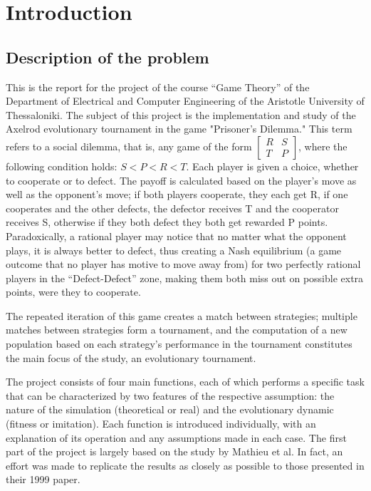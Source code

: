 \section{Introduction}
\subsection{Description of the problem}
This is the report for the project of the course ``Game Theory'' of the Department of Electrical and Computer Engineering of the Aristotle University of Thessaloniki. The subject of this project is the implementation and study of the Axelrod evolutionary tournament in the game "Prisoner's Dilemma." This term refers to a social dilemma, that is, any game of the form $\begin{bmatrix} R & S \\ T & P \end{bmatrix}$, where the following condition holds: $S < P < R < T$. Each player is given a choice, whether to cooperate or to defect. The payoff is calculated based on the player's move as well as the opponent's move; if both players cooperate, they each get R, if one cooperates and the other defects, the defector receives T and the cooperator receives S, otherwise if they both defect they both get rewarded P points. Paradoxically, a rational player may notice that no matter what the opponent plays, it is always better to defect, thus creating a Nash equilibrium (a game outcome that no player has motive to move away from) for two perfectly rational players in the ``Defect-Defect'' zone, making them both miss out on possible extra points, were they to cooperate. 

The repeated iteration of this game creates a match between strategies; multiple matches between strategies form a tournament, and the computation of a new population based on each strategy’s performance in the tournament constitutes the main focus of the study, an evolutionary tournament.

The project consists of four main functions, each of which performs a specific task that can be characterized by two features of the respective assumption: the nature of the simulation (theoretical or real) and the evolutionary dynamic (fitness or imitation). Each function is introduced individually, with an explanation of its operation and any assumptions made in each case. The first part of the project is largely based on the study by Mathieu et al. In fact, an effort was made to replicate the results as closely as possible to those presented in their 1999 paper.

